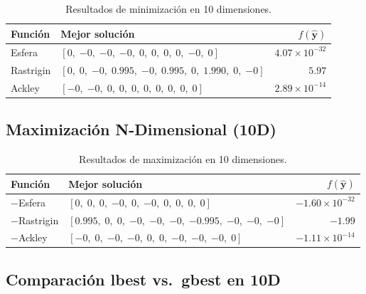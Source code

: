 \documentclass[11pt]{article}
\begin{document}
\begin{table}[H]
\centering
\begin{tabular}{lp{8.5cm}r}
\hline\hline
Funci\'on & Mejor soluci\'on & $f(\hat{\mathbf{y}})$ \\
\hline
Esfera    & $[0,\;{-0},\;{-0},\;{-0},\;0,\;0,\;0,\;0,\;{-0},\;0]$                              & $4.07\times10^{-32}$ \\[3pt]
Rastrigin & $[0,\;0,\;{-0},\;0.995,\;{-0},\;0.995,\;0,\;1.990,\;0,\;{-0}]$                    & $5.97$ \\[3pt]
Ackley    & $[{-0},\;{-0},\;0,\;0,\;0,\;0,\;0,\;0,\;0,\;0]$                                   & $2.89\times10^{-14}$ \\
\hline\hline
\end{tabular}
\caption{Resultados de minimizaci\'on en 10 dimensiones.}
\end{table}

\subsection{Maximizaci\'on N-Dimensional (10D)}

\begin{table}[H]
\centering
\begin{tabular}{lp{8.5cm}r}
\hline\hline
Funci\'on & Mejor soluci\'on & $f(\hat{\mathbf{y}})$ \\
\hline
$-$Esfera    & $[0,\;0,\;0,\;{-0},\;0,\;{-0},\;0,\;0,\;0,\;0]$                               & $-1.60\times10^{-32}$ \\[3pt]
$-$Rastrigin & $[0.995,\;0,\;0,\;{-0},\;{-0},\;{-0},\;{-0.995},\;{-0},\;{-0},\;{-0}]$       & $-1.99$ \\[3pt]
$-$Ackley    & $[{-0},\;0,\;{-0},\;{-0},\;0,\;0,\;{-0},\;{-0},\;{-0},\;0]$                  & $-1.11\times10^{-14}$ \\
\hline\hline
\end{tabular}
\caption{Resultados de maximizaci\'on en 10 dimensiones.}
\end{table}

\subsection{Comparaci\'on lbest vs.\ gbest en 10D}
\end{document}

